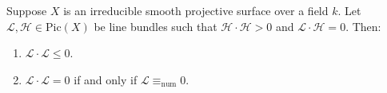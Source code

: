 

\begin{theorem}
Suppose $X$ is an irreducible smooth projective surface over a field $k$. Let $\mathcal{L}, \mathcal{H} \in \text{Pic}(X)$ be line bundles such that $\mathcal{H} \cdot \mathcal{H} > 0$ and $\mathcal{L} \cdot \mathcal{H} = 0$. Then:
\begin{enumerate}
    \item[(a)] $\mathcal{L} \cdot \mathcal{L} \leq 0$.
    \item[(b)] $\mathcal{L} \cdot \mathcal{L} = 0$ if and only if $\mathcal{L} \equiv_{\text{num}} 0$.
\end{enumerate}
\end{theorem}

